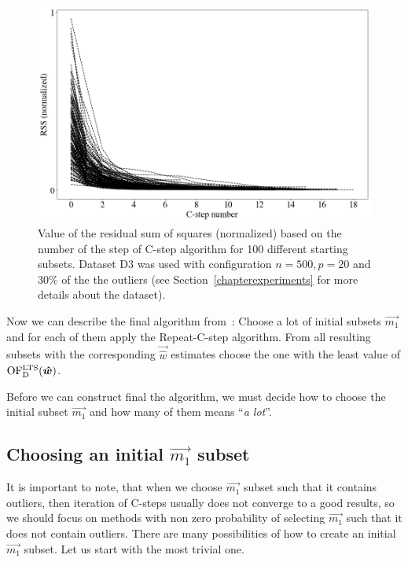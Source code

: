 \begin{figure}[h]
\centering
\includegraphics[width=12cm]{img/lts_convergence}
\caption{Value of the residual sum of squares (normalized) based on the number of the step of C-step algorithm for 100 different starting subsets. Dataset D3 was used with configuration $n=500, p=20$ and $30\%$ of the the outliers (see Section~\ref{chapterexperiments} for more details about the dataset). }
\label{figure:repeat:c:steps:cnt:converge}
\end{figure}

Now we can describe the final algorithm from~\cite{rouss:2000}: Choose a lot of initial subsets $\vec{m_1}$ and for each of them apply the Repeat-C-step algorithm. From all resulting subsets with the corresponding $\vec{\hat{w}}$ estimates choose the one with the least value of $\operatorname{OF^{LTS}_D}(\boldsymbol{\hat{w}})$. 

Before we can construct final the algorithm, we must decide how to choose the initial subset $\vec{m_1}$ and how many of them means ``\emph{a lot}''.




\subsection{Choosing an initial $\vec{m_1}$ subset}

It is important to note, that when we choose $\vec{m_1}$ subset such that it contains outliers, then iteration of  C-steps usually does not converge to a good results, so we should focus on methods with non zero probability of selecting $\vec{m_1}$ such that it does not contain outliers.
There are many possibilities of how to create an initial $\vec{m_1}$ subset. Let us start with the most trivial one.



